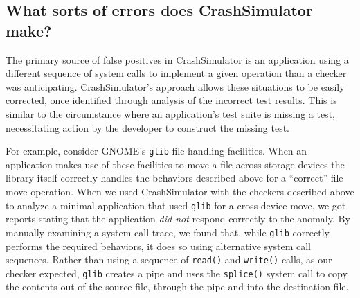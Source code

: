         
\subsection{What sorts of errors does CrashSimulator make?}
\label{sec-sorts-errors}
%
The primary source of false positives %
in CrashSimulator is an
application using a different sequence of system calls to implement a given
operation than a checker was
anticipating. CrashSimulator's
approach allows these situations to be easily corrected, once identified through
analysis of the incorrect test results.  This
is similar to the circumstance where an application's test suite is missing a
test, necessitating action by the developer to construct the missing test.


For example, consider GNOME's {\tt glib} file handling facilities.  When an
application makes use of these facilities to move a file across storage devices
the library itself correctly handles the behaviors described above 
for a ``correct'' file move operation.  When we used CrashSimulator 
with the checkers described above to
analyze a minimal application that used {\tt glib} for a cross-device move,
we got reports stating that the application {\em did not} respond
correctly to the anomaly.
By manually examining
a system call trace, we found that, while {\tt glib} correctly performs
the required behaviors, it does so using alternative system call sequences. 
Rather than using a sequence of
{\tt read()} and {\tt write()} calls, 
as our checker expected,
{\tt glib} creates a pipe and uses the
{\tt splice()} system call to copy the contents out of the source file, through
the pipe and into the destination file.

